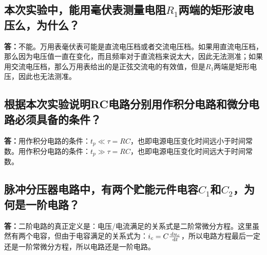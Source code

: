 \documentclass[a4paper,11pt,UTF8]{ctexart}
\newcommand\dd{\thinspace\mathrm{d}}
\newcommand\ddone[2]{\frac{\dd #1}{\dd #2}}
\begin{document}
\subsection{本次实验中，能用毫伏表测量电阻$R_1$两端的矩形波电压么，为什么？}
\textbf{答：}不能。万用表毫伏表可能是直流电压档或者交流电压档。如果用直流电压档，那么因为电压值一直在变化，而且频率对于直流档来说太大，因此无法测准；如果用交流电压档，那么万用表给出的是正弦交流电的有效值，但是$R_1$两端是矩形电压，因此也无法测准。
\subsection{根据本次实验说明RC电路分别用作积分电路和微分电路必须具备的条件？}
\textbf{答：}用作积分电路的条件：$t_p\ll \tau=RC$，也即电源电压变化时间远小于时间常数。用作积分电路的条件：$t_p\gg \tau=RC$，也即电源电压变化时间远大于时间常数。
\subsection{脉冲分压器电路中，有两个贮能元件电容$C_1$和$C_2$，为何是一阶电路？}
\textbf{答：}二阶电路的真正定义是：电压/电流满足的关系式是二阶常微分方程。这里虽然有两个电容，但由于电容满足的关系式为：$i_c=C\ddone{u_c}{t}$，所以电路方程最后一定还是一阶常微分方程，所以电路还是一阶电路。
\end{document}
